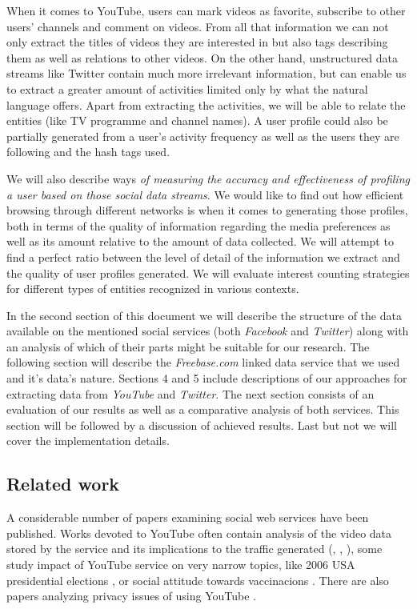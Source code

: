 \documentclass{article}
\begin{document}
When it comes to YouTube, users can mark videos as favorite, subscribe to other users' channels and comment on videos. From all that information we can not only extract the titles of videos they are interested in but also tags describing them as well as relations to other videos. On the other hand, unstructured data streams like Twitter contain much more irrelevant information, but can enable us to extract a greater amount of activities limited only by what the natural language offers. Apart from extracting the activities, we will be able to relate the entities (like TV programme and channel names). A user profile could also be partially generated from a user's activity frequency as well as the users they are following and the hash tags used.

We will also describe ways \textit{of measuring the accuracy and effectiveness of profiling a user based on those social data streams}. We would like to find out how efficient browsing through different networks is when it comes to generating those profiles, both in terms of the quality of information regarding the media preferences as well as its amount relative to the amount of data collected. We will attempt to find a perfect ratio between the level of detail of the information we extract and the quality of user profiles generated. We will evaluate interest counting strategies for different types of entities recognized in various contexts.

In the second section of this document we will describe the structure of the data available on the mentioned social services (both \textit{Facebook} and \textit{Twitter}) along with an analysis of which of their parts might be suitable for our research. The following section will describe the \textit{Freebase.com} linked data service that we used and it's data's nature. Sections 4 and 5 include descriptions of our approaches for extracting data from \textit{YouTube} and \textit{Twitter}. The next section consists of an evaluation of our results as well as a comparative analysis of both services. This section will be followed by a discussion of achieved results. Last but not we will cover the implementation details.

\subsection{Related work}

A considerable number of papers examining social web services have been
published. Works devoted to YouTube often contain analysis of the video data
stored by the service and its implications to the traffic generated
(\cite{i-tube-you-tube}, \cite{views-from-the-edge},
\cite{statistics-and-social-network}), some study impact of YouTube service on
very narrow topics, like 2006 USA presidential elections
\cite{voters-myspace-youtube}, or social attitude towards vaccinacions
\cite{keelan}. There are also papers analyzing privacy issues of using YouTube
\cite{publicly-private}.
\end{document}
